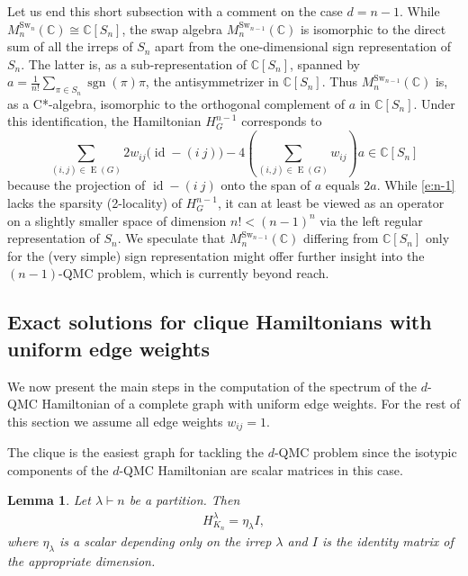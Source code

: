 \documentclass[12pt,dvipsnames,accepted=2016-08-18,a4paper,onecolumn]{quantumarticle}
\DeclareMathOperator{\EE}{E}
\DeclareMathOperator{\id}{id}
\numberwithin{equation}{section}
\newcommand{\CC}{\mathbb C}
\newtheorem{lemma}[theorem]{Lemma}
\theoremstyle{definition}
\begin{document}
Let us end this short subsection with a comment on the case $d=n-1$. While $M^{\text{Sw}_n}_n(\mathbb{C})\cong \CC[S_n]$, the swap algebra $M^{\text{Sw}_{n-1}}_n(\mathbb{C})$ is isomorphic to the direct sum of all the irreps of $S_n$ apart from the one-dimensional sign representation of $S_n$. The latter is, as a sub-representation of $\CC[S_n]$, spanned by $a=\frac{1}{n!}\sum_{\pi \in S_n}\operatorname{sgn}(\pi)\pi$, the antisymmetrizer in $\CC[S_n]$.
Thus $M^{\text{Sw}_{n-1}}_n(\mathbb{C})$ is, as a C*-algebra, isomorphic to the orthogonal complement of $a$ in $\CC[S_n]$. Under this identification, the Hamiltonian $H_G^{n-1}$ corresponds to
\begin{equation}\label{e:n-1}
\sum_{(i,j) \in \EE(G)} 2 w_{ij} \big(\id - (i\ j)\big) -4\left(\sum_{(i,j) \in \EE(G)} w_{ij}\right)a\in \CC[S_n]
\end{equation}
because the projection of $\id - (i\ j)$ onto the span of $a$ equals $2a$. While \eqref{e:n-1} lacks the sparsity (2-locality) of $H_G^{n-1}$, it can at least be viewed as an operator on a slightly smaller space of dimension $n!<(n-1)^n$ via the left regular representation of $S_n$.
We speculate that $M^{\text{Sw}_{n-1}}_n(\mathbb{C})$ differing from $\CC[S_n]$ only for the (very simple) sign representation might offer further insight into the $(n-1)$-QMC problem, which is currently beyond reach.



\subsection{Exact solutions for clique Hamiltonians with uniform edge weights}\label{subsec ev-3}
We now present the main steps in the computation of the spectrum of the $d$-QMC Hamiltonian of a complete graph  with uniform edge weights. For the rest of this section we assume all edge weights $w_{ij}=1$. 

The clique is the easiest graph for tackling the $d$-QMC problem since 
the isotypic components of the $d$-QMC Hamiltonian are scalar matrices in this case.

\begin{lemma}\label{lemma scalar}
	Let $\lambda \vdash n$ be a partition. Then
	\begin{align}\label{eq: eta}
			H_{K_n}^\lambda = \eta_\lambda I,
	\end{align}
	where $\eta_\lambda$ is a scalar depending only on the irrep $\lambda$ and $I$ is the identity matrix of the appropriate dimension.
\end{lemma}
\end{document}

